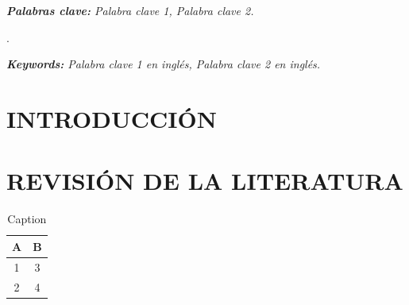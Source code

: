 \documentclass[11pt,oneside,a4paper]{book}
\begin{document}
\justifying

\noindent 
\lipsum[1]


\textit{\textbf{Palabras clave:} Palabra clave 1, Palabra clave 2.}


\newpage
\thispagestyle{plain}
\large









\justifying

\noindent 
\lipsum[1].


\textit{\textbf{Keywords:} Palabra clave 1 en inglés, Palabra clave 2 en inglés.}








\pagebreak


\normalsize
\chapter[CAPÍTULO I - INTRODUCCIÓN]{INTRODUCCIÓN}


\lipsum[1]


\chapter[CAPÍTULO II - REVISIÓN DE LA LITERATURA]{REVISIÓN DE LA LITERATURA}
\citet{pulido2012análisis} \lipsum[4-13]
\begin{table}[H]
    \centering
    \caption{Caption}
    \begin{tabular}{cc}
\hline
A & B\\
\hline
       1  & 3 \\
        2 & 4\\
\hline
    \end{tabular}
     \label{tab:my_label}
\end{table}
\end{document}
